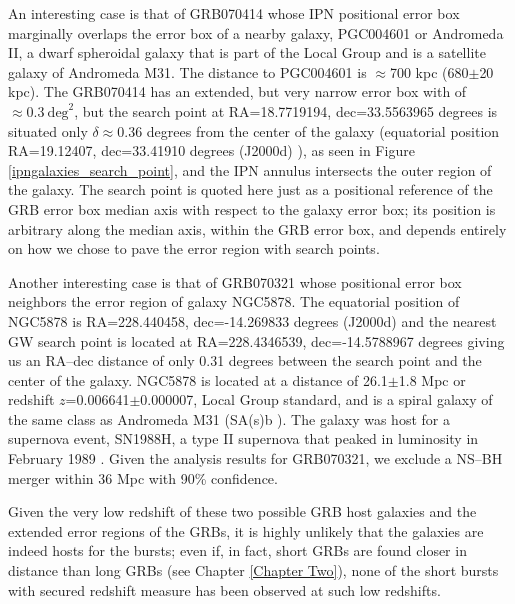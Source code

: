 An interesting case is that of GRB070414 whose IPN positional error box marginally overlaps the error box of a nearby galaxy, PGC004601 or Andromeda II, a dwarf spheroidal galaxy that is part of the Local Group and is a satellite galaxy of Andromeda M31. The distance to PGC004601 is $\approx$700 kpc (680$\pm$20 kpc). The GRB070414 has an extended, but very narrow error box with of $\approx0.3~\mathrm{deg}^2$, but the search point at RA=18.7719194, dec=33.5563965 degrees is situated only $\delta \approx$0.36 degrees from the center of the galaxy (equatorial position RA=19.12407, dec=33.41910 degrees (J2000d) \cite{ned}), as seen in Figure \ref{ipngalaxies_search_point}, and the IPN annulus intersects the outer region of the galaxy. The search point is quoted here just as a positional reference of the GRB error box median axis with respect to the galaxy error box; its position is arbitrary along the median axis, within the GRB error box, and depends entirely on how we chose to pave the error region with search points.

Another interesting case is that of GRB070321 whose positional error box neighbors the error region of galaxy NGC5878. The equatorial position of NGC5878 is RA=228.440458, dec=-14.269833 degrees (J2000d) \cite{gwgc,ned} and the nearest GW search point is located at RA=228.4346539, dec=-14.5788967 degrees giving us an RA--dec distance of only 0.31 degrees between the search point and the center of the galaxy. NGC5878 is located at a distance of 26.1$\pm$1.8 Mpc or redshift $z$=0.006641$\pm$0.000007, Local Group standard, and is a spiral galaxy of the same class as Andromeda M31 (SA(s)b \cite{ned}). The galaxy was host for a supernova event, SN1988H, a type II supernova that peaked in luminosity in February 1989 \cite{Cappellaro:1995ht}. Given the analysis results for GRB070321, we exclude a NS--BH merger within 36 Mpc with 90\% confidence.

Given the very low redshift of these two possible GRB host galaxies and the extended error regions of the GRBs, it is highly unlikely that the galaxies are indeed hosts for the bursts; even if, in fact, short GRBs are found closer in distance than long GRBs (see Chapter \ref{Chapter Two}), none of the short bursts with secured redshift measure has been observed at such low redshifts.


